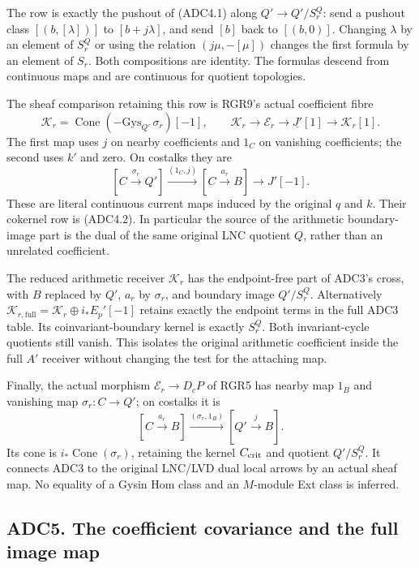 The row is exactly the pushout of (ADC4.1) along \(Q'\to Q'/S_r^Q\):
send a pushout class \([(b,[\lambda])]\) to \([b+j\lambda]\), and send
\([b]\) back to \([(b,0)]\). Changing \(\lambda\) by an element of
\(S_r^Q\) or using the relation \((j\mu,-[\mu])\) changes the first
formula by an element of \(S_r\). Both compositions are identity. The
formulas descend from continuous maps and are continuous for quotient
topologies.

The sheaf comparison retaining this row is RGR9's actual coefficient
fibre \[
\mathscr K_r=\operatorname{Cone}(-\mathrm{Gys}_{Q'}\,\sigma_r)[-1],
\qquad
\mathscr K_r\longrightarrow\mathscr E_r
\longrightarrow\underline{J'}[1]\longrightarrow\mathscr K_r[1].
\tag{ADC4.3}
\] The first map uses \(j\) on nearby coefficients and \(1_C\) on
vanishing coefficients; the second uses \(k'\) and zero. On costalks
they are \[
[C\xrightarrow{\sigma_r}Q']\xrightarrow{(1_C,j)}
[C\xrightarrow{a_r}B]\longrightarrow J'[-1].
\tag{ADC4.4}
\] These are literal continuous current maps induced by the original
\(q\) and \(k\). Their cokernel row is (ADC4.2). In particular the
source of the arithmetic boundary-image part is the dual of the same
original LNC quotient \(Q\), rather than an unrelated coefficient.

The reduced arithmetic receiver \(\mathscr K_r\) has the endpoint-free
part of ADC3's cross, with \(B\) replaced by \(Q'\), \(a_r\) by
\(\sigma_r\), and boundary image \(Q'/S_r^Q\). Alternatively
\(\mathscr K_{r,\mathrm{full}}=\mathscr K_r\oplus i_*E_p'[-1]\) retains
exactly the endpoint terms in the full ADC3 table. Its
coinvariant-boundary kernel is exactly \(S_r^Q\). Both invariant-cycle
quotients still vanish. This isolates the original arithmetic
coefficient inside the full \(A'\) receiver without changing the test
for the attaching map.

Finally, the actual morphism \(\mathscr E_r\to D_cP\) of RGR5 has nearby
map \(1_B\) and vanishing map \(\sigma_r:C\to Q'\); on costalks it is \[
[C\xrightarrow{a_r}B]\xrightarrow{(\sigma_r,1_B)}
[Q'\xrightarrow jB].
\tag{ADC4.5}
\] Its cone is \(i_*\operatorname{Cone}(\sigma_r)\), retaining the
kernel \(C_{\rm crit}\) and quotient \(Q'/S_r^Q\). It connects ADC3 to
the original LNC/LVD dual local arrows by an actual sheaf map. No
equality of a Gysin Hom class and an \(M\)-module Ext class is inferred.

\subsection{ADC5. The coefficient covariance and the full image
map}\label{adc5.-the-coefficient-covariance-and-the-full-image-map}


